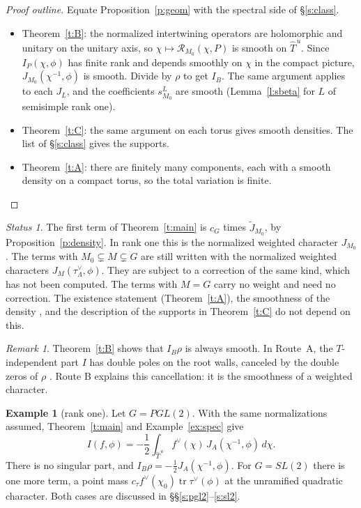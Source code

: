 \documentclass[12pt,letterpaper]{article}
\numberwithin{equation}{section}
\theoremstyle{plain}
\theoremstyle{definition}
\newtheorem{example}[theorem]{Example}
\theoremstyle{remark}
\newtheorem{remark}[theorem]{Remark}
\newtheorem{status}[theorem]{Status}
\newcommand{\Thu}{\widehat{T}^{\,u}}
\DeclareMathOperator{\tr}{tr}
\begin{document}
\begin{proof}[Proof outline]
Equate Proposition~\ref{p:geom} with the spectral side of \S\ref{s:class}.
\begin{itemize}
\item Theorem~\ref{t:B}: the normalized intertwining operators are holomorphic and unitary on the unitary axis, so $\chi\mapsto\mathcal R_{M_0}(\chi,P)$ is smooth on $\Thu$. Since $I_P(\chi,\phi)$ has finite rank and depends smoothly on $\chi$ in the compact picture, $J_{M_0}(\chi^{-1},\phi)$ is smooth. Divide by $\rho$ to get $I_B$. The same argument applies to each $J_L$, and the coefficients $s^L_{M_0}$ are smooth (Lemma~\ref{l:sbeta} for $L$ of semisimple rank one).
\item Theorem~\ref{t:C}: the same argument on each torus gives smooth densities. The list of \S\ref{s:class} gives the supports.
\item Theorem~\ref{t:A}: there are finitely many components, each with a smooth density on a compact torus, so the total variation is finite.
\end{itemize}
\end{proof}

\begin{status}\label{st:main}
The first term of Theorem~\ref{t:main} is $c_G$ times $\widetilde J_{M_0}$, by Proposition~\ref{p:density}. In rank one this is the normalized weighted character $J_{M_0}$. The terms with $M_0\subsetneq M\subsetneq G$ are still written with the normalized weighted characters $J_M(\tau_\Lambda^\vee,\phi)$. They are subject to a correction of the same kind, which has not been computed. The terms with $M=G$ carry no weight and need no correction. The existence statement (Theorem~\ref{t:A}), the smoothness of the density \cite[Lemma~12.1]{Ar91}, and the description of the supports in Theorem~\ref{t:C} do not depend on this.
\end{status}

\begin{remark}
Theorem~\ref{t:B} shows that $I_B\rho$ is always smooth. In Route~A, the $T$-independent part $I$ has double poles on the root walls, canceled by the double zeros of $\rho$ \cite[Rem.~6.2, (A.4)]{JC26}. Route B explains this cancellation: it is the smoothness of a weighted character.
\end{remark}

\begin{example}[rank one]\label{ex:main}
Let $G=PGL(2)$. With the same normalizations assumed, Theorem~\ref{t:main} and Example~\ref{ex:spec} give
\[
I(f,\phi)=-\frac12\int_{\Thu}f^\vee(\chi)\,J_A(\chi^{-1},\phi)\,d\chi.
\]
There is no singular part, and $I_B\rho=-\frac12J_A(\chi^{-1},\phi)$. For $G=SL(2)$ there is one more term, a point mass $c_\tau f^\vee(\chi_0)\tr\tau^\vee(\phi)$ at the unramified quadratic character. Both cases are discussed in \S\S\ref{s:pgl2}--\ref{s:sl2}.
\end{example}
\end{document}
